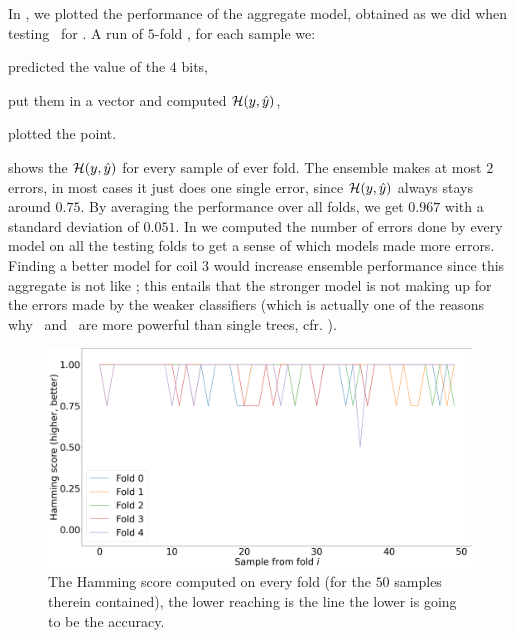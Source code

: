 In , we plotted the performance of the aggregate model, obtained as we
did when testing \tas\ for \qrp. A run of $5$-fold \cv, for each sample we:
\begin{inparaenum}[(i)]
\item predicted the value of the $4$ bits,
\item put them in a vector and computed $\mathcal{H}(y, \hat{y})$,
\item plotted the point.
\end{inparaenum}
 shows the $\mathcal{H}(y, \hat{y})$ for every sample of ever fold. The ensemble makes at most $2$
errors, in most cases it just does one single error, since $\mathcal{H}(y, \hat{y})$ always stays around $0.75$. By
averaging the performance over all folds, we get $0.967$ with a standard deviation of $0.051$. In
 we computed the number of errors done by every model on all the testing folds
to get a sense of which models made more errors. Finding a better model for coil $3$ would increase
ensemble performance since this aggregate is not like \tas; this entails that the stronger model is not making up
for the errors made by the weaker classifiers (which is actually one of the reasons why \rfs\ and
\tas\ are more powerful than single trees, cfr. ).
\begin{figure}[!ht]
	\centering
	\includegraphics[width=\linewidth]{img/best_dts_hs.png}
	\caption{The Hamming score computed on every fold (for the $50$ samples therein contained), the lower reaching is the line the lower is going to be the accuracy.} \label{fig:dt-qlp-hs}
\end{figure}

